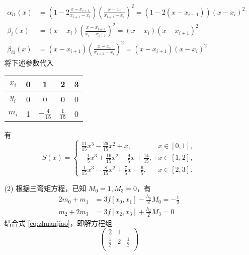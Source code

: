 \documentclass{sjtuarticle}
\begin{document}
\begin{itemize}
\begin{solution}
\begin{itemize}
\begin{align*}
                \alpha_{i1}(x)&=\left(1-2\frac{x-x_{i+1}}{x_{i+1}-x_{i}}\right)\left(\frac{x-x_{i}}{x_{i+1}-x_{i}}\right)^2=(1-2(x-x_{i+1}))(x-x_i)^2\\
                \beta_i(x)&=(x-x_i)\left(\frac{x-x_{i+1}}{x_i-x_{i+1}}\right)^2=(x-x_i)(x-x_{i+1})^2\\
                \beta_{i1}(x)&=(x-x_{i+1})\left(\frac{x-x_{i}}{x_{i+1}-x_i}\right)^2=(x-x_{i+1})(x-x_i)^2
            \end{align*}
            将下述参数代入
            \begin{table}[H]
                \centering
                \begin{tabular}{c*{4}{c}}
                    \toprule
                    $x_i$ & 0 & 1 & 2 & 3 \\
                    \midrule
                    $y_i$ & 0 & 0 & 0 & 0 \\
                    $m_i$ & 1 & $-\frac{4}{15}$ & $\frac{1}{15}$ & 0 \\
                    \bottomrule
                \end{tabular}
            \end{table}
            有
            \begin{equation*}
                S(x)=\begin{cases}
                    \frac{11 }{15}x^{3} - \frac{26 }{15}x^{2} + x,& x\in[0,1],\\
                    - \frac{1}{5}x^{3} + \frac{16 }{15}x^{2} - \frac{9 }{5}x + \frac{14}{15},&x\in[1,2],\\
                    \frac{1}{15}x^{3} - \frac{8 }{15}x^{2} + \frac{7 }{5}x - \frac{6}{5},&x\in[2,3].
                \end{cases}
            \end{equation*}
            \item[(2)] 根据三弯矩方程，已知 $M_0=1,M_3=0$，有
            \begin{align*}
                2m_0+m_1&=3f[x_0,x_1]-\frac{h_0}{2}M_0=-\frac{1}{2} \\
                m_2+2m_3&=3f[x_2,x_3]+\frac{h_2}{2}M_3=0
            \end{align*}
            结合式 \eqref{eq:zhuanjiao}，即解方程组
            \begin{equation*}
                \begin{pmatrix}
                    2 & 1 \\
                    \frac{1}{2} & 2 & \frac{1}{2} \\

\end{pmatrix}
\end{equation*}
\end{itemize}
\end{solution}
\end{itemize}
\end{document}
